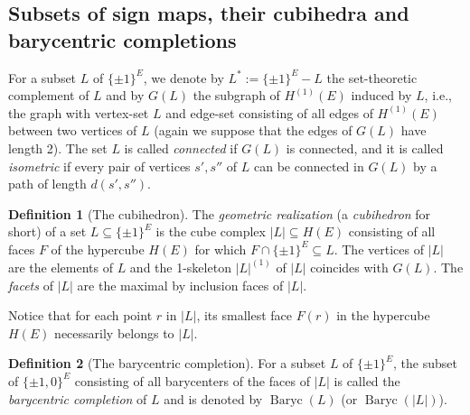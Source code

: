 \documentclass[11pt,a4paper]{amsart}
\theoremstyle{definition}
\newtheorem{definition}{Definition}
\numberwithin{equation}{section}
\DeclareMathOperator{\Baryc}{Baryc}
\newcommand{\covectors}{\ensuremath{L}}
\newcommand{\HH}{\ensuremath{H}}
\newcommand{\FF}{\ensuremath{F}}
\begin{document}

\subsection{Subsets of sign maps, their cubihedra and barycentric completions}
For a subset ${\covectors}$ of $\{ \pm 1\}^E$, we denote by ${\covectors}^*:=\{ \pm 1\}^E-{\covectors}$ the set-theoretic complement of $\covectors$ and by  $G({\covectors})$ the subgraph of  ${\HH}^{(1)}(E)$ induced by $\covectors$,
i.e., the graph with vertex-set $L$ and edge-set consisting of all edges of ${\HH}^{(1)}(E)$ between two vertices of $\covectors$ (again we suppose that the edges of $G(L)$ have length 2). The set $\covectors$ is
called {\it connected}
if $G({\covectors})$ is connected, and it is called {\it isometric} if every
pair of vertices $s',s''$ of $\covectors$ can be connected in $G({\covectors})$
by a path of length $d(s',s'').$

\begin{definition} [The cubihedron] The \emph{geometric realization} (a {\it cubihedron} for short) of  a set $L\subseteq \{ \pm 1\}^E$ is the cube complex $|{\covectors}|\subseteq \HH(E)$
consisting of all faces $\FF$ of the hypercube ${\HH}(E)$   for which ${\FF}\cap \{ \pm 1\}^E\subseteq {\covectors}.$ The vertices of $|{\covectors}|$ are  the elements of ${\covectors}$
and  the 1-skeleton $|{\covectors}|^{(1)}$ of $|{\covectors}|$ coincides with $G(\covectors)$. The \emph{facets} of $|\covectors|$ are the maximal by inclusion faces of $|\covectors|$.
\end{definition}

Notice that for each point $r$ in  $|\covectors|$, its smallest face $F(r)$ in the hypercube $\HH(E)$ necessarily belongs to $|\covectors|$.

\begin{definition} [The barycentric completion] For a subset $L$ of $\{ \pm 1\}^E$, the subset of $\{ \pm 1, 0\}^E$ consisting  of all barycenters of the faces of $|\covectors|$  is called the \emph{barycentric completion} of $\covectors$ and is denoted by $\Baryc(\covectors)$ (or $\Baryc(|\covectors|)$).
\end{definition}
\end{document}
